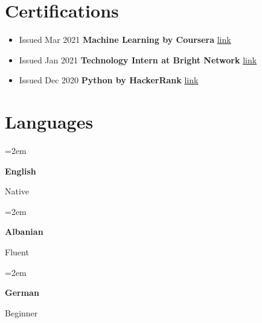 \documentclass[12pt]{article} %
\newlength{\spacebox}
\newcommand{\lan}[2]{      
	
	
	\noindent\hangindent=2em\hangafter=0     
	
	
	\parbox{\spacebox}{%
		
		\textbf{#1}} %
	
	#2 \par}    %
\begin{document}
	
	\section*{Certifications}
	
		\begin{itemize}
			\item{Issued Mar 2021}
			\textbf{Machine Learning by Coursera}
			{\href{https://coursera.org/verify/4YYK2Y233Y6Z}{link}}
		
			\item{Issued Jan 2021}
			\textbf{Technology Intern at Bright Network}
			{\href{https://www.brightnetwork.co.uk/certificates/technology-internship-experien_2d14qoedf44spg/}{link}}
			
			\item{Issued Dec 2020}
			\textbf{Python by HackerRank}
			{\href{https://www.hackerrank.com/certificates/629ffbd69653}{link}}
		\end{itemize}
	
	
	\section*{Languages}
	
	\lan{English}{Native} 
	
	\lan{Albanian}{Fluent} 
	
	\lan{German}{Beginner}
	
\end{document}
